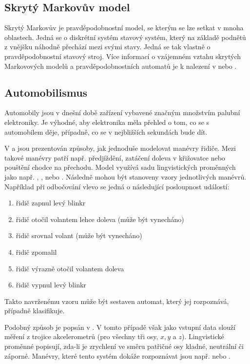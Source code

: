 \documentclass[a4paper,10pt]{article}
\begin{document}
\subsection{Skrytý Markovův model}
Skrytý Markovův je pravděpodobnostní model, se kterým se lze setkat v mnoha oblastech. Jedná se o diskrétní systém stavový systém, který na základě podnětů z vnějšku náhodně přechází mezi svými stavy. Jedná se tak vlastně o pravděpodobnostní stavový stroj. Více informací o vzájemném vztahu skrytých Markovových modelů a pravděpodobnostních automatů je k nalezení v \cite{DupDenEsp-LiProAuHidMarMod+} nebo 
\cite{Hac+-ProAnaLarFinStaMac}.

\subsection{Automobilismus}
Automobily jsou v dnešní době zařízení vybavené značným množstvím palubní elektroniky. Je výhodné, aby elektronika měla přehled o tom, co se s automobilem děje, případně, co se v nejbližších sekundách bude dít.

V \cite{Hul+-ManRecUsProFinStaMacFuzLog} a \cite{TriHei-ExpDesSeqFuzPer} jsou prezentován způsoby, jak jednoduše modelovat manévry řidiče. Mezi takové manévry patří např. předjíždění, zatáčení doleva v křižovatce nebo pouštění chodce na přechodu. Model využívá sadu lingvistických proměnných jako např. , ,  nebo . Následně mohou být stanoveny vzory jednotlivých manévrů. Například při odbočování vlevo se jedná o následující posloupnost událostí:
\begin{enumerate}
 \item řidič zapnul levý blinkr
 \item řidič otočil volantem lehce doleva (může být vynecháno)
 \item řidič srovnal volant (může být vynecháno)
 \item řidič zpomalil
 \item řidič výrazně otočil volantem doleva
 \item řidič vypnul levý blinkr
\end{enumerate}

Takto navrženému vzoru může být sestaven automat, který jej rozpoznává, případně klasifikuje.

Podobný způsob je popsán v \cite{Hul+-ManRecUsProFinStaMacFuzLog}. V tomto případě však jako vstupní data slouží měření z trojice akcelerometrů (pro všechny tři osy, $x, y$ a $z$). Lingvistické proměnné popisují, zda-li je zrychlení ve směru patřičné osy kladné, neutrální či záporné. Manévry, které tento systém dokáže rozpoznávat jsou např.  nebo .
\end{document}
